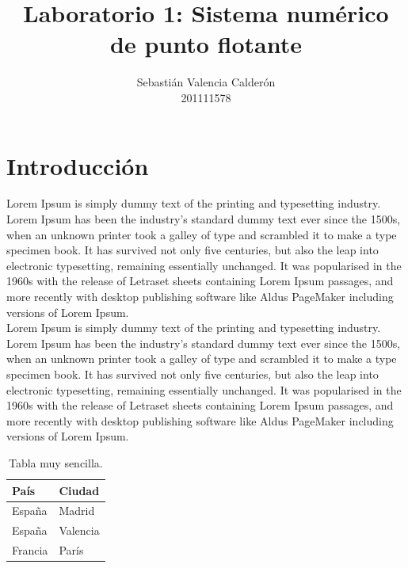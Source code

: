 \documentclass[11pt, spanish]{article}
\date{}
\begin{document}
\author{Sebastián Valencia Calderón \\ 201111578}
\title{Laboratorio 1: Sistema numérico de punto flotante}
\maketitle

\section{Introducción}

Lorem Ipsum is simply dummy text of the printing and typesetting industry. Lorem Ipsum has been the industry's standard dummy text ever since the 1500s, when an unknown printer took a galley of type and scrambled it to make a type specimen book. It has survived not only five centuries, but also the leap into electronic typesetting, remaining essentially unchanged. It was popularised in the 1960s with the release of Letraset sheets containing Lorem Ipsum passages, and more recently with desktop publishing software like Aldus PageMaker including versions of Lorem Ipsum. \\

Lorem Ipsum is simply dummy text of the printing and typesetting industry. Lorem Ipsum has been the industry's standard dummy text ever since the 1500s, when an unknown printer took a galley of type and scrambled it to make a type specimen book. It has survived not only five centuries, but also the leap into electronic typesetting, remaining essentially unchanged. It was popularised in the 1960s with the release of Letraset sheets containing Lorem Ipsum passages, and more recently with desktop publishing software like Aldus PageMaker including versions of Lorem Ipsum.

\begin{table}[htbp]
\begin{center}
\begin{tabular}{|l|l|}
\hline
País & Ciudad \\
\hline \hline
España & Madrid \\ \hline
España & Valencia \\ \hline
Francia & París \\ \hline
\end{tabular}
\caption{Tabla muy sencilla.}
\label{tabla:sencilla}
\end{center}
\end{table}
\end{document}
